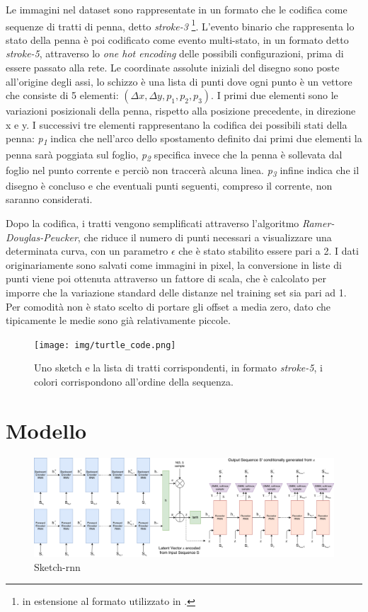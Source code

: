 Le immagini nel dataset sono rappresentate in un formato che le codifica come sequenze di tratti di penna, detto \textit{stroke-3} \footnote{in estensione al formato utilizzato in \cite{sequence}.}. L'evento binario che rappresenta lo stato della penna è poi codificato come evento multi-stato, in un formato detto \textit{stroke-5}, attraverso lo \textit{one hot encoding} delle possibili configurazioni, prima di essere passato alla rete. Le coordinate assolute iniziali del disegno sono poste all'origine degli assi, lo schizzo è una lista di punti dove ogni punto è un vettore che consiste di 5 elementi: $(\Delta x, \Delta y, p_1, p_2, p_3)$. I primi due elementi sono le variazioni posizionali della penna, rispetto alla posizione precedente, in direzione x e y. I successivi tre elementi rappresentano la codifica dei possibili stati della penna: \textit{p\textsubscript{1}} indica che nell'arco dello spostamento definito dai primi due elementi la penna sarà poggiata sul foglio, \textit{p\textsubscript{2}} specifica invece che la penna è sollevata dal foglio nel punto corrente e perciò non traccerà alcuna linea. \textit{p\textsubscript{3}} infine indica che il disegno è concluso e che eventuali punti seguenti, compreso il corrente, non saranno considerati.

Dopo la codifica, i tratti vengono semplificati attraverso l'algoritmo \textit{Ramer-Douglas-Peucker}\cite{rdp}, che riduce il numero di punti necessari a visualizzare una determinata curva, con un parametro $\epsilon$ che è stato stabilito essere pari a 2. I dati originariamente sono salvati come immagini in pixel, la conversione in liste di punti viene poi ottenuta attraverso un fattore di scala, che è calcolato per imporre che la variazione standard delle distanze nel training set sia pari ad 1. Per comodità non è stato scelto di portare gli offset a media zero, dato che tipicamente le medie sono già relativamente piccole.
\begin{figure}[ht]
	\centering
	\texttt{[image: img/turtle\_code.png]}
	\caption{Uno sketch e la lista di tratti corrispondenti, in formato \textit{stroke-5}, i colori corrispondono all'ordine della sequenza.}
	\label{fig:1.18}
\end{figure}
\section{Modello} %
\label{sec:modello}
\begin{figure}[ht]
	\centering
	\includegraphics[width=\linewidth]{img/sketch_model.png}
	\caption{Sketch-rnn}
	\label{fig:1.15}
\end{figure}

